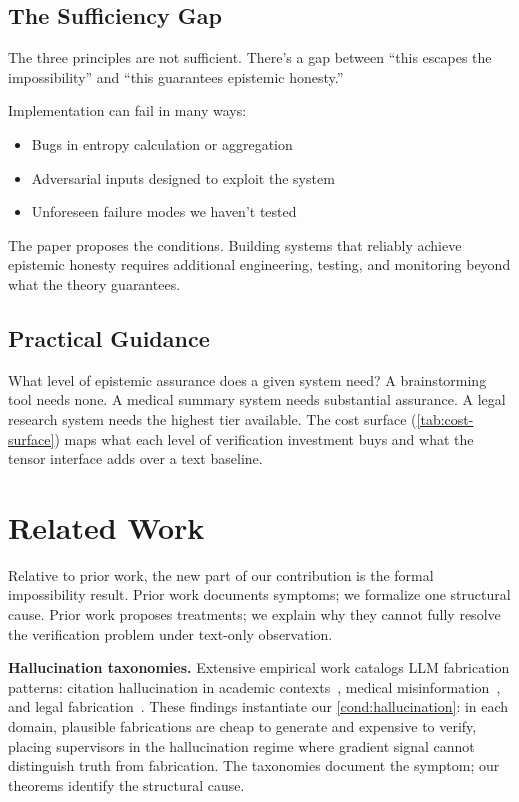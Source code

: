 \documentclass[11pt]{article}
\newcommand{\fakepara}[1]{\noindent\textbf{#1}\xspace}
\begin{document}
\subsection{The Sufficiency Gap}

The three principles are not sufficient. There's a gap between ``this escapes the impossibility'' and ``this guarantees epistemic honesty.''

Implementation can fail in many ways:
\begin{itemize}
    \item Bugs in entropy calculation or aggregation
    \item Adversarial inputs designed to exploit the system
    \item Unforeseen failure modes we haven't tested
\end{itemize}

The paper proposes the conditions. Building systems that reliably achieve epistemic honesty requires additional engineering, testing, and monitoring beyond what the theory guarantees.

\subsection{Practical Guidance}

What level of epistemic assurance does a given system need? A brainstorming tool needs none. A medical summary system needs substantial assurance. A legal research system needs the highest tier available. The cost surface (\autoref{tab:cost-surface}) maps what each level of verification investment buys and what the tensor interface adds over a text baseline.

\section{Related Work}\label{sec:related}

Relative to prior work, the new part of our contribution is the formal
impossibility result. Prior work documents
symptoms; we formalize one structural cause. Prior work proposes treatments; we
explain why they cannot fully resolve the verification problem under text-only
observation.

\fakepara{Hallucination taxonomies.} Extensive empirical work catalogs LLM
fabrication patterns: citation hallucination in academic
contexts~\citep{alkaissi2023artificial}, medical
misinformation~\citep{thirunavukarasu2023large}, and legal
fabrication~\citep{dahl2024large}. These findings instantiate our
\autoref{cond:hallucination}: in each domain, plausible fabrications are
cheap to generate and expensive to verify, placing supervisors in the hallucination
regime where gradient signal cannot distinguish truth from fabrication. The
taxonomies document the symptom; our theorems identify the structural cause.
\end{document}

